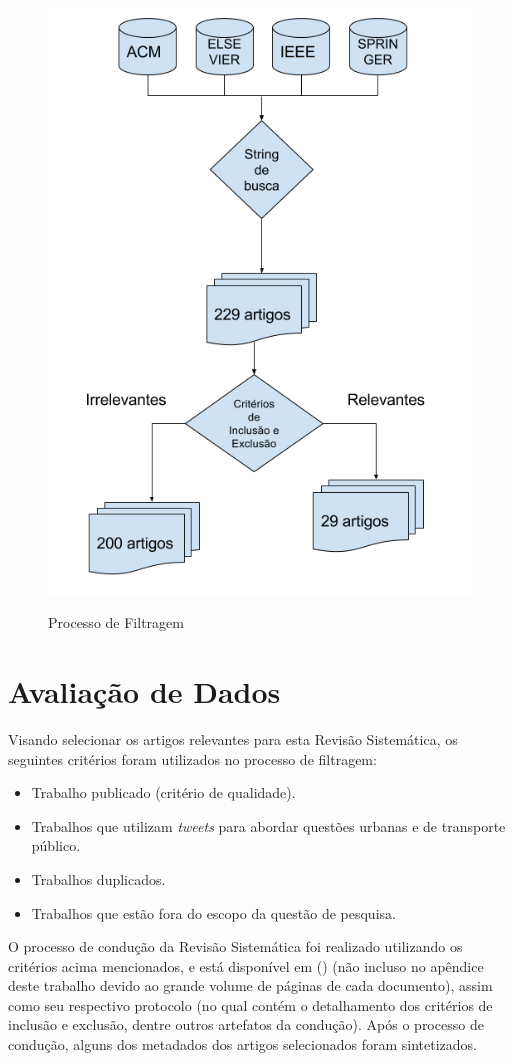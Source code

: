 \documentclass[
	12pt,				%
	oneside,			%
	a4paper,			%
	english,			%
	brazil				%
	]{abntex2ppgsi}
\begin{document}
{{{\begin{figure}[H]%
	\centering
 	  \caption{Processo de Filtragem}
		\includegraphics[width=0.5\linewidth]{images/metodologia_metodologia.png}
	\label{fig:filter}
\end{figure}

\section{Avaliação de Dados}
\label{avaliacao}

Visando selecionar os artigos relevantes para esta Revisão Sistemática, os seguintes critérios foram utilizados no processo de filtragem:

\begin{itemize}
\item Trabalho publicado (critério de qualidade).
\item Trabalhos que utilizam \textit{tweets} para abordar questões urbanas e de transporte público.
\item Trabalhos duplicados.
\item Trabalhos que estão fora do escopo da questão de pesquisa.
\end{itemize}

O processo de condução da Revisão Sistemática foi realizado utilizando os critérios acima mencionados, e está disponível em \citeauthor{fcas} (\citeyear{fcas}) (não incluso no apêndice deste trabalho devido ao grande volume de páginas de cada documento),  assim como seu respectivo protocolo (no qual contém o detalhamento dos critérios de inclusão e exclusão, dentre outros artefatos da condução). Após o processo de condução, alguns dos metadados dos artigos selecionados foram sintetizados.

}}}
\end{document}
